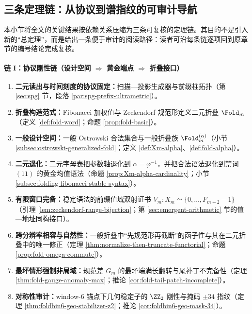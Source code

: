 \subsection{三条定理链：从协议到谱指纹的可审计导航}\label{subsec:three-theorem-chains-rewrite-skeleton}

本小节将全文的关键结果按依赖关系压缩为三条可复核的定理链。其目的不是引入新的“总定理”，而是给出一条便于审计的阅读路径：读者可沿每条链逐项回到原章节的编号结论完成复核。

\paragraph{链 I：协议刚性链（设计空间 \texorpdfstring{$\Rightarrow$}{=>} 黄金端点 \texorpdfstring{$\Rightarrow$}{=>} 折叠接口）}
\begin{enumerate}
  \item \textbf{二元读出与时间刻度的协议固定：}扫描—投影生成器与前缀柱拓扑（第 \ref{sec:spg} 节，段落 \ref{par:spg-prefix-ultrametric}）。
  \item \textbf{折叠构造范式：}Fibonacci 加权值与 Zeckendorf 规范形定义二元折叠 \(\Fold_m\)（定义 \ref{def:fold-word}；命题 \ref{prop:fold-basic}）。
  \item \textbf{一般设计空间：}一般 Ostrowski 合法集合与一般折叠族 \(\Fold_m^{(\alpha)}\)（小节 \ref{subsec:ostrowski-generalized-fold}；定义 \ref{def:Xm-alpha}、\ref{def:fold-alpha}）。
  \item \textbf{二元退化：}二元字母表把参数轴退化到 \(\alpha=\varphi^{-1}\)，并把合法语法退化到禁词 \((11)\) 的黄金均值语法（命题 \ref{prop:Xm-alpha-cardinality}；小节 \ref{subsec:folding-fibonacci-stable-syntax}）。
  \item \textbf{有限窗口完备：}稳定语法的前缀值域双射证书 \(V_m:X_m\simeq\{0,\dots,F_{m+2}-1\}\)（引理 \ref{lem:zeckendorf-range-bijection}；第 \ref{sec:emergent-arithmetic} 节的值—地址同构接口）。
  \item \textbf{跨分辨率相容与自然性：}一般折叠中“先规范形再截断”的函子性与其在二元折叠中的唯一修正（定理 \ref{thm:normalize-then-truncate-functorial}；命题 \ref{prop:fold-omega-commute}）。
  \item \textbf{最坏情形强制非局域：}规范差 \(G_m\) 的最坏端满长翻转与尾补丁不完备性（定理 \ref{thm:fold-gauge-anomaly-max}；推论 \ref{cor:fold-tail-patch-incomplete}）。
  \item \textbf{对称性审计：}window-\(6\) 锚点下几何稳定子的 \(\ZZ_2\) 刚性与掩码 \(\pm 34\) 指纹（定理 \ref{thm:foldbin6-geo-stabilizer-z2}；推论 \ref{cor:foldbin6-geo-mask-34}）。
\end{enumerate}

